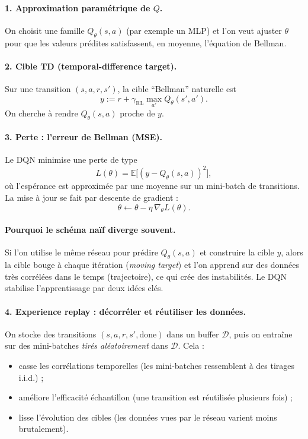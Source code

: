 \documentclass[11pt,a4paper]{article}
\newcommand{\1}{\mathbf{1}}
\begin{document}
\paragraph{1. Approximation param\'etrique de $Q$.}
On choisit une famille $Q_\theta(s,a)$ (par exemple un MLP) et l'on veut ajuster $\theta$ pour que
les valeurs pr\'edites satisfassent, en moyenne, l'\'equation de Bellman.

\paragraph{2. Cible TD (temporal-difference target).}
Sur une transition $(s,a,r,s')$, la cible ``Bellman'' naturelle est
\[
y := r + \gamma_{\mathrm{RL}} \max_{a'} Q_\theta(s',a').
\]
On cherche \`a rendre $Q_\theta(s,a)$ proche de $y$.

\paragraph{3. Perte : l'erreur de Bellman (MSE).}
Le DQN minimise une perte de type
\[
L(\theta)=\mathbb{E}\big[(y - Q_\theta(s,a))^2\big],
\]
o\`u l'esp\'erance est approxim\'ee par une moyenne sur un mini-batch de transitions.
La mise \`a jour se fait par descente de gradient :
\[
\theta \leftarrow \theta - \eta\,\nabla_\theta L(\theta).
\]

\paragraph{Pourquoi le sch\'ema na\"if diverge souvent.}
Si l'on utilise le m\^eme r\'eseau pour pr\'edire $Q_\theta(s,a)$ et construire la cible $y$,
alors la cible bouge \`a chaque it\'eration (\emph{moving target}) et l'on apprend sur des donn\'ees tr\`es corr\'el\'ees
dans le temps (trajectoire), ce qui cr\'ee des instabilit\'es.
Le DQN stabilise l'apprentissage par deux id\'ees cl\'es.

\paragraph{4. Experience replay : d\'ecorr\'eler et r\'eutiliser les donn\'ees.}
On stocke des transitions $(s,a,r,s',\mathrm{done})$ dans un buffer $\mathcal{D}$, puis on entra\^{i}ne sur des mini-batches
\emph{tir\'es al\'eatoirement} dans $\mathcal{D}$. Cela :
\begin{itemize}
  \item casse les corr\'elations temporelles (les mini-batches ressemblent \`a des tirages i.i.d.) ;
  \item am\'eliore l'efficacit\'e \'echantillon (une transition est r\'eutilis\'ee plusieurs fois) ;
  \item lisse l'\'evolution des cibles (les donn\'ees vues par le r\'eseau varient moins brutalement).
\end{itemize}
\end{document}
